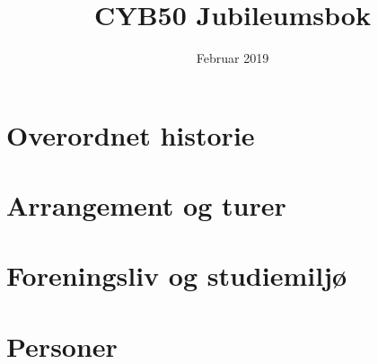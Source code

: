 \documentclass[hidelinks, openany, 12pt, a4paper]{book}
\title{CYB50 Jubileumsbok}
\author{}
\date{Februar 2019}
\begin{document}
\maketitle



\part{Overordnet historie}













\part{Arrangement og turer}









\part{Foreningsliv og studiemiljø}












\part{Personer}











\end{document}
